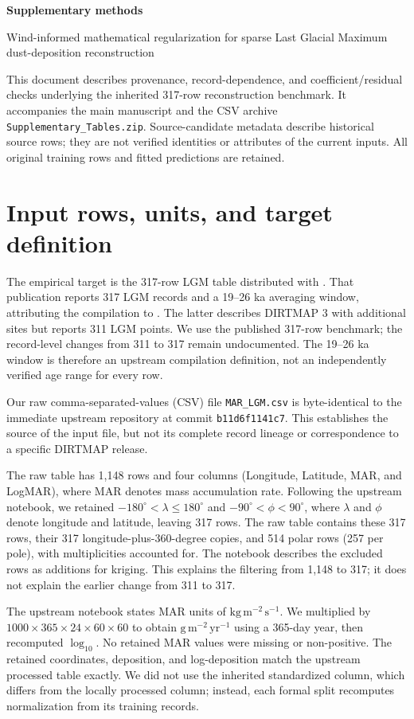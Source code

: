 \documentclass[11pt,a4paper]{article}
\begin{document}
\begin{center}
{\Large\bfseries Supplementary methods}\par\medskip
{\large Wind-informed mathematical regularization for sparse Last Glacial Maximum dust-deposition reconstruction}
\end{center}
This document describes provenance, record-dependence, and coefficient/residual checks underlying the inherited 317-row reconstruction benchmark. It accompanies the main manuscript and the CSV archive \texttt{Supplementary\_Tables.zip}. Source-candidate metadata describe historical source rows; they are not verified identities or attributes of the current inputs. All original training rows and fitted predictions are retained.

\section{Input rows, units, and target definition}
The empirical target is the 317-row LGM table distributed with \citet{MolinaCatricheo2024}. That publication reports 317 LGM records and a 19--26 ka averaging window, attributing the compilation to \citet{Lambert2015}. The latter describes DIRTMAP 3 with additional sites but reports 311 LGM points. We use the published 317-row benchmark; the record-level changes from 311 to 317 remain undocumented. The 19--26 ka window is therefore an upstream compilation definition, not an independently verified age range for every row. 

Our raw comma-separated-values (CSV) file \texttt{MAR\_LGM.csv} is byte-identical to the immediate upstream repository at commit \texttt{b11d6f1141c7}. This establishes the source of the input file, but not its complete record lineage or correspondence to a specific DIRTMAP release.

The raw table has 1,148 rows and four columns (Longitude, Latitude, MAR, and LogMAR), where MAR denotes mass accumulation rate. Following the upstream notebook, we retained $-180^{\circ}<\lambda\leq180^{\circ}$ and $-90^{\circ}<\phi<90^{\circ}$, where $\lambda$ and $\phi$ denote longitude and latitude, leaving 317 rows. The raw table contains these 317 rows, their 317 longitude-plus-360-degree copies, and 514 polar rows (257 per pole), with multiplicities accounted for. The notebook describes the excluded rows as additions for kriging. This explains the filtering from 1,148 to 317; it does not explain the earlier change from 311 to 317.

The upstream notebook states MAR units of $\mathrm{kg\,m^{-2}\,s^{-1}}$. We multiplied by $1000\times365\times24\times60\times60$ to obtain $\mathrm{g\,m^{-2}\,yr^{-1}}$ using a 365-day year, then recomputed $\log_{10}$. No retained MAR values were missing or non-positive. The retained coordinates, deposition, and log-deposition match the upstream processed table exactly. We did not use the inherited standardized column, which differs from the locally processed column; instead, each formal split recomputes normalization from its training records.
\end{document}
